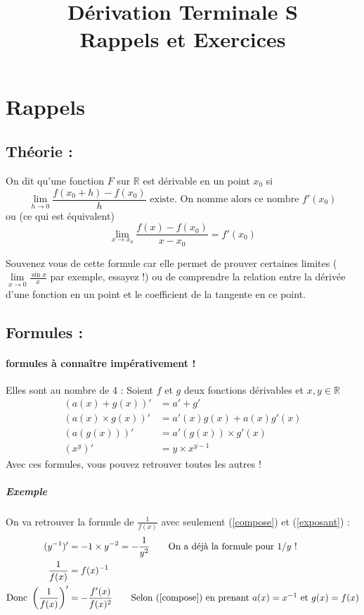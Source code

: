 \documentclass[11pt]{article}
\title{Dérivation Terminale S\\
        \large Rappels et Exercices}
\date{}
\author{}
\newcommand{\R}{\mathbb R}
\begin{document}
    
    \maketitle
    
    \section{Rappels}
        \subsection{Théorie :}
        On dit qu'une fonction $F$ sur $\R$ est dérivable en un point $x_0$ si
        \begin{equation}
            \lim\limits_{h \to 0} \frac{f(x_0 + h)-f(x_0)}{h} \text{ existe. On nomme alors ce nombre $f'(x_0)$} 
        \end{equation}
        ou (ce qui est équivalent)
        \begin{equation*}
            \lim\limits_{x \to x_0} \frac{f(x)-f(x_0)}{x-x_0} = f'(x_0)            
        \end{equation*}

        Souvenez vous de cette formule car elle permet de prouver certaines limites ($\lim\limits_{x \to 0} \frac{\sin{x}}{x}$ par exemple, essayez !) ou de comprendre la relation entre la dérivée d'une fonction en un point et le coefficient de la tangente en ce point.

        \subsection{Formules :}
        \paragraph{formules à connaître impérativement !}
        Elles sont au nombre de 4 : Soient $f$ et $g$ deux fonctions dérivables et $x,y \in  \R $
        \begin{align}
            (a(x) + g(x))' &= a' +g' \label{addition} \\
            (a(x) \times g(x))' &= a'(x)g(x) + a(x)g'(x) \label{produit}\\
            (a(g(x)))' &= a'(g(x))\times g'(x) \label{compose}\\
            (x^y)' &= y\times x^{y-1} \label{exposant}
        \end{align}
        Avec ces formules, vous pouvez retrouver toutes les autres !
        \subparagraph{Exemple} On va retrouver la formule de $\frac{1}{f(x)}$ avec seulement (\ref{compose}) et (\ref{exposant}) :
        \begin{align*}
            (y^{-1})' &= -1\times y^{-2} =-\frac{1}{y^2} \tag*{On a déjà la formule pour $1/y$ !}\\
            \frac{1}{f(x)} &= f(x)^{-1} \\ 
            \text{Donc } \left(\frac{1}{f(x)}\right)' &=- \frac{f'(x)}{f(x)^2} \tag*{Selon (\ref{compose}) en prenant $a(x)=x^{-1}$ et $g(x)=f(x)$} 
        \end{align*}
\end{document}
